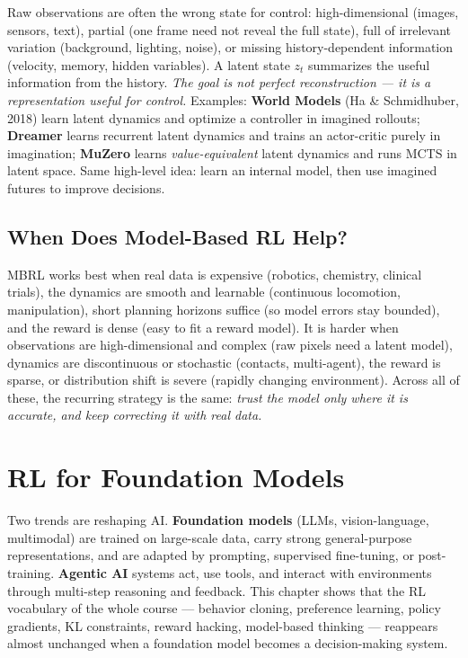 \documentclass[11pt, oneside]{book}
\begin{document}
Raw observations are often the wrong state for control: high-dimensional (images, sensors,
text), partial (one frame need not reveal the full state), full of irrelevant variation
(background, lighting, noise), or missing history-dependent information (velocity, memory,
hidden variables). A latent state $z_t$ summarizes the useful information from the history.
\emph{The goal is not perfect reconstruction --- it is a representation useful for control.}
Examples: \textbf{World Models} (Ha \& Schmidhuber, 2018) learn latent dynamics and optimize
a controller in imagined rollouts; \textbf{Dreamer} learns recurrent latent dynamics and
trains an actor-critic purely in imagination; \textbf{MuZero} learns \emph{value-equivalent}
latent dynamics and runs MCTS in latent space. Same high-level idea: learn an internal
model, then use imagined futures to improve decisions.

\section{When Does Model-Based RL Help?}

MBRL works best when real data is expensive (robotics, chemistry, clinical trials), the
dynamics are smooth and learnable (continuous locomotion, manipulation), short planning
horizons suffice (so model errors stay bounded), and the reward is dense (easy to fit a
reward model). It is harder when observations are high-dimensional and complex (raw pixels
need a latent model), dynamics are discontinuous or stochastic (contacts, multi-agent),
the reward is sparse, or distribution shift is severe (rapidly changing environment).
Across all of these, the recurring strategy is the same: \emph{trust the model only where
it is accurate, and keep correcting it with real data.}


\chapter{RL for Foundation Models}
\label{chap:fm}

Two trends are reshaping AI. \textbf{Foundation models} (LLMs, vision-language, multimodal)
are trained on large-scale data, carry strong general-purpose representations, and are
adapted by prompting, supervised fine-tuning, or post-training. \textbf{Agentic AI} systems
act, use tools, and interact with environments through multi-step reasoning and feedback.
This chapter shows that the RL vocabulary of the whole course --- behavior cloning,
preference learning, policy gradients, KL constraints, reward hacking, model-based thinking
--- reappears almost unchanged when a foundation model becomes a decision-making system.
\end{document}
